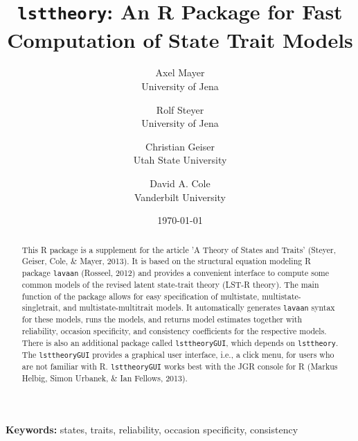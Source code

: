 \documentclass[10pt]{article}\usepackage{graphicx, color}
\begin{document}



\title{\texttt{lsttheory}: An \textsf{R}  Package for Fast Computation of State Trait Models}

\author{
  Axel Mayer\\
  University of Jena
  \and
  Rolf Steyer\\
  University of Jena
  \and
  Christian Geiser\\
  Utah State University
  \and
  David A. Cole\\
  Vanderbilt University
}

\date{\today}
\maketitle

\begin{abstract}
This \textsf{R} \cite{RCoreTeam} package is a supplement for the article 'A Theory of States and Traits' (Steyer, Geiser, Cole, \& Mayer, 2013). It is based on the structural equation modeling \textsf{R} package \texttt{lavaan} (Rosseel, 2012) and provides a convenient interface to compute some common models of the revised latent state-trait theory (LST-R theory). The main function of the package allows for easy specification of multistate, multistate-singletrait, and multistate-multitrait models. It automatically generates \texttt{lavaan} syntax for these models, runs the models, and returns model estimates together with reliability, occasion specificity, and consistency coefficients for the respective models. There is also an additional package called
\texttt{lsttheoryGUI}, which depends on \texttt{lsttheory}. The \texttt{lsttheoryGUI} provides a graphical user interface, i.e., a click menu, for users who are not familiar with \textsf{R}. \texttt{lsttheoryGUI} works best with the JGR console for R (Markus Helbig, Simon Urbanek, \& Ian Fellows, 2013).

\end{abstract}

\noindent
{\bf Keywords:} states, traits, reliability, occasion specificity, consistency \\
\end{document}
